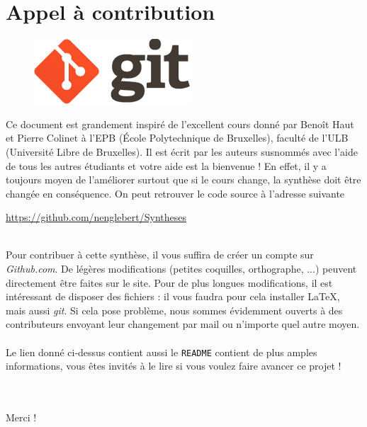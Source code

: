 \chapter*{Appel à contribution}
\begin{figure}
\includegraphics[scale=0.5]{git.png}
\end{figure}
Ce document est grandement inspiré de l’excellent cours donné 
par Benoît Haut et Pierre Colinet à l’EPB (École Polytechnique de Bruxelles), faculté de l’ULB (Université 
Libre de Bruxelles). Il est écrit par les auteurs susnommés avec l’aide de tous les autres étudiants 
et votre aide est la bienvenue ! En effet, il y a toujours moyen de l’améliorer surtout que si le 
cours change, la synthèse doit être changée en conséquence. On peut retrouver le code source à l’adresse 
suivante
\begin{center}
\url{https://github.com/nenglebert/Syntheses}
\end{center}\ \\
Pour contribuer à cette synthèse, il vous suffira de créer un compte sur \textit{Github.com}. De
légères modifications (petites coquilles, orthographe, ...) peuvent directement être faites sur le
site. Pour de plus longues modifications, il est intéressant de disposer des fichiers : il vous 
faudra pour cela installer \LaTeX, mais aussi \textit{git}. Si cela pose problème, nous sommes 
évidemment ouverts à des contributeurs envoyant leur changement par mail ou n’importe quel autre 
moyen.\\
\\
Le lien donné ci-dessus contient aussi le \texttt{README} contient de plus amples informations, 
vous êtes invités à le lire si vous voulez faire avancer ce projet ! \\
\\
\\
\begin{flushright}
Merci ! 
\end{flushright}